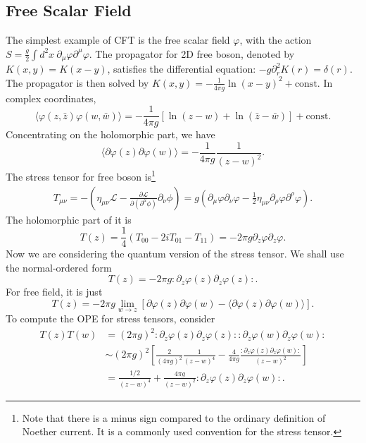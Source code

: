 \documentclass[aps,prb,superscriptaddress,nofootinbib]{revtex4}
\newcommand{\normord}[1]{{:\mathrel{#1}:}}
\begin{document}
\subsection{Free Scalar Field}
The simplest example of CFT is the free scalar field $\varphi$, with the action $S = \frac{g}{2}\int d^2x\ \partial_\mu\varphi \partial^\mu \varphi$.
The propagator for 2D free boson, denoted by $K(x,y) = K(x-y)$, satisfies the differential equation: $-g \partial_r^2 K(r)  = \delta(r)$.
The propagator is then solved by $K(x,y) = -\frac{1}{4\pi g} \ln(x-y)^2 + \text{const}$.
In complex coordinates,
\begin{equation}
	\langle\varphi(z,\bar z)\varphi(w,\bar w)\rangle = -\frac{1}{4\pi g}\left[\ln(z-w) + \ln(\bar z- \bar w)\right] + \text{const}. 
\end{equation}
Concentrating on the holomorphic part, we have
\begin{equation}
	\langle\partial\varphi(z)\partial\varphi(w)\rangle = -\frac{1}{4\pi g}\frac{1}{(z-w)^2}.
\end{equation}
The stress tensor for free boson is\footnote{Note that there is a minus sign compared to the ordinary definition of Noether current. It is a commonly used convention for the stress tensor.}
\begin{equation}
\begin{aligned}
	T_{\mu\nu} = -\left(\eta_{\mu\nu} \mathcal L - \frac{\partial\mathcal L}{\partial(\partial^\mu\phi)}\partial_\nu \phi \right)
	= g\left(\partial_\mu\varphi\partial_\nu\varphi - \frac{1}{2} \eta_{\mu\nu}\partial_\rho\varphi\partial^\rho\varphi \right).
\end{aligned}
\end{equation}
The holomorphic part of it is
\begin{equation}
	T(z) = \frac{1}{4}(T_{00} - 2iT_{01} - T_{11}) = -2\pi g \partial_z\varphi \partial_z\varphi.
\end{equation}
Now we are considering the quantum version of the stress tensor.
We shall use the normal-ordered form
\begin{equation}
	T(z) = -2\pi g \normord{\partial_z\varphi(z) \partial_z\varphi(z)}.
\end{equation}
For free field, it is just
\begin{equation}
	T(z) = -2\pi g \lim_{w\rightarrow z}\left[\partial\varphi(z)\partial\varphi(w)-\langle\partial\varphi(z)\partial\varphi(w)\rangle\right].
\end{equation}
To compute the OPE for stress tensors, consider
\begin{equation}
\begin{aligned}
	T(z)T(w) 
	&= (2\pi g)^2 \normord{\partial_z\varphi(z) \partial_z\varphi(z)} \normord{\partial_z\varphi(w) \partial_z\varphi(w)} \\
	&\sim (2\pi g)^2 \left[\frac{2}{(4\pi g)^2}\frac{1}{(z-w)^4} - \frac{4}{4\pi g}\frac{\normord{\partial_z\varphi(z)\partial_z\varphi(w)}}{(z-w)^2}\right] \\
	&= \frac{1/2}{(z-w)^4} + \frac{4\pi g}{(z-w)^2}\normord{\partial_z\varphi(z)\partial_z\varphi(w)}.
\end{aligned}
\end{equation}
\end{document}
